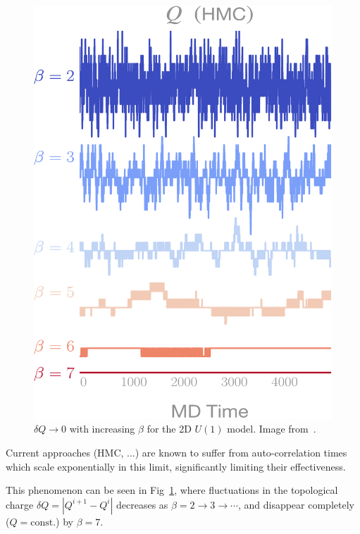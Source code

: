 \documentclass[a4paper,11pt]{article}
\begin{document}
\begin{figure}
  \begin{center}
  \caption{\label{fig:csd}$\delta Q \rightarrow 0$ with increasing $\beta$ for the 2D $U(1)$ model. Image from~\cite{foreman_leapfroglayers_2022}.}
  \includegraphics[width=\linewidth]{assets/csd1}
  \end{center}
\end{figure}
%

Current approaches (HMC, ...) are known to suffer from auto-correlation times
which scale exponentially in this limit, significantly limiting their
effectiveness.
%

This phenomenon can be seen in Fig~\ref{fig:csd}, where fluctuations in the
topological charge $\delta Q = |Q^{i + 1} - Q^{i}|$ decreases as $\beta = 2
\rightarrow 3 \rightarrow \cdots$, and disappear completely ($Q =
\mathrm{const.}$) by $\beta = 7$.
%
%
\end{document}
